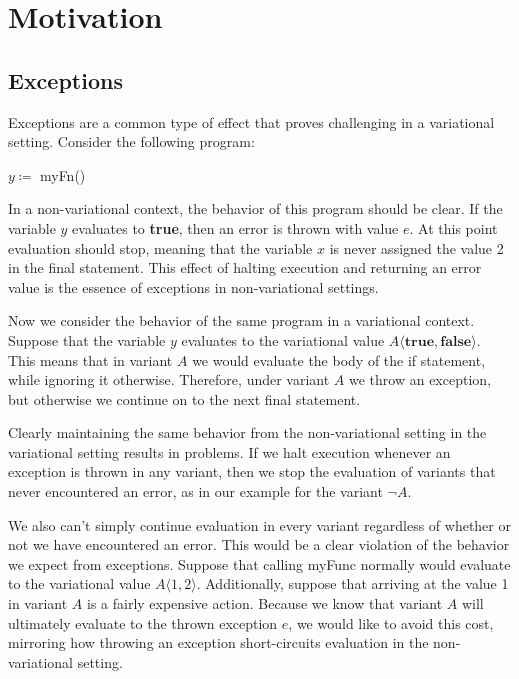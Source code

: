 \documentclass[letterpaper,10pt,onecolumn]{article}
\begin{document}
\section{Motivation}

\subsection{Exceptions}

Exceptions are a common type of effect that proves challenging in a variational setting.
Consider the following program:

\begin{algorithmic}
\STATE $y \coloneqq$ myFn()
\ENDIF
{}
\end{algorithmic}

In a non-variational context, the behavior of this program should be clear.
If the variable $y$ evaluates to \textbf{true}, then an error is thrown with value
$e$. At this point evaluation should stop, meaning that the variable $x$ is never
assigned the value 2 in the final statement. This effect of halting execution and
returning an error value is the essence of exceptions in non-variational settings.

Now we consider the behavior of the same program in a variational context.
Suppose that the variable $y$ evaluates to the variational value
$A \langle \textbf{true}, \textbf{false} \rangle$. This means that in variant $A$ we
would evaluate the body of the if statement, while ignoring it otherwise. Therefore,
under variant $A$ we throw an exception, but otherwise we continue on to the next
final statement.

Clearly maintaining the same behavior from the non-variational setting in the variational setting
results in problems. If we halt execution whenever an exception is
thrown in any variant, then we stop the evaluation of variants that never encountered an error,
as in our example for the variant $\neg A$.

We also can't simply continue evaluation
in every variant regardless of whether or not we have encountered an error. This would be
a clear violation of the behavior we expect from exceptions.
Suppose that calling myFunc normally would evaluate to the variational value $A\langle 1, 2 \rangle$.
Additionally, suppose that arriving at the value 1 in variant $A$ is a fairly expensive action.
Because we know that variant $A$ will ultimately evaluate to the thrown exception $e$, we would
like to avoid this cost, mirroring how throwing an exception short-circuits evaluation in the
non-variational setting. 
\end{document}
